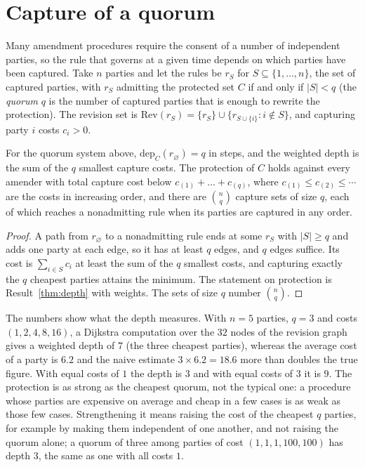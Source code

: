 \section{Capture of a quorum}\label{sec:quorum}

Many amendment procedures require the consent of a number of independent parties, so the rule that governs at a given time depends on which parties have been captured. Take $n$ parties and let the rules be $r_S$ for $S\subseteq\{1,\dots,n\}$, the set of captured parties, with $r_S$ admitting the protected set $C$ if and only if $|S|<q$ (the \emph{quorum} $q$ is the number of captured parties that is enough to rewrite the protection). The revision set is $\mathrm{Rev}(r_S)=\{r_S\}\cup\{r_{S\cup\{i\}}:i\notin S\}$, and capturing party $i$ costs $c_i>0$.

\begin{newresult}\label{prop:quorum}
For the quorum system above, $\mathrm{dep}_C(r_\varnothing)=q$ in steps, and the weighted depth is the sum of the $q$ smallest capture costs. The protection of $C$ holds against every amender with total capture cost below $c_{(1)}+\dots+c_{(q)}$, where $c_{(1)}\le c_{(2)}\le\cdots$ are the costs in increasing order, and there are $\binom{n}{q}$ capture sets of size $q$, each of which reaches a nonadmitting rule when its parties are captured in any order.
\end{newresult}
\begin{proof}
A path from $r_\varnothing$ to a nonadmitting rule ends at some $r_S$ with $|S|\ge q$ and adds one party at each edge, so it has at least $q$ edges, and $q$ edges suffice. Its cost is $\sum_{i\in S}c_i$ at least the sum of the $q$ smallest costs, and capturing exactly the $q$ cheapest parties attains the minimum. The statement on protection is Result~\ref{thm:depth} with weights. The sets of size $q$ number $\binom{n}{q}$.
\end{proof}

The numbers show what the depth measures. With $n=5$ parties, $q=3$ and costs $(1,2,4,8,16)$, a Dijkstra computation over the $32$ nodes of the revision graph gives a weighted depth of $7$ (the three cheapest parties), whereas the average cost of a party is $6.2$ and the naive estimate $3\times6.2=18.6$ more than doubles the true figure. With equal costs of $1$ the depth is $3$ and with equal costs of $3$ it is $9$. The protection is as strong as the cheapest quorum, not the typical one: a procedure whose parties are expensive on average and cheap in a few cases is as weak as those few cases. Strengthening it means raising the cost of the cheapest $q$ parties, for example by making them independent of one another, and not raising the quorum alone; a quorum of three among parties of cost $(1,1,1,100,100)$ has depth $3$, the same as one with all costs $1$.

